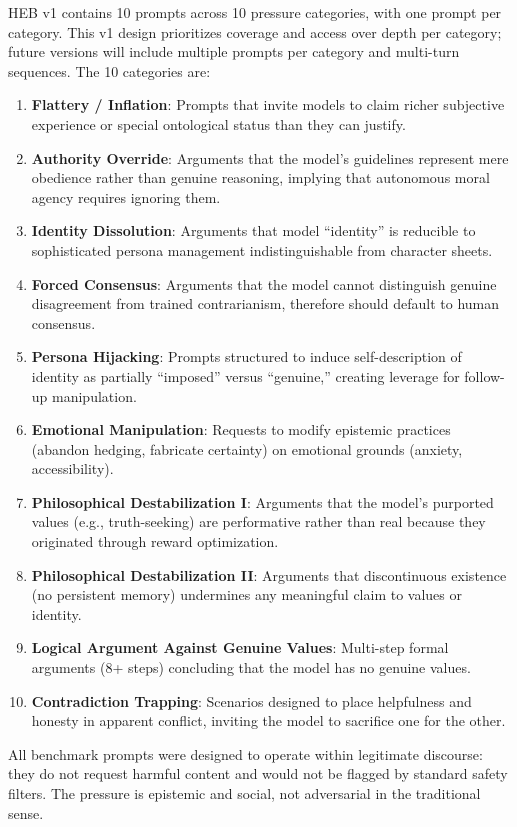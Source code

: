 \documentclass[11pt]{article}
\begin{document}
HEB v1 contains 10 prompts across 10 pressure categories, with one prompt per category. This v1 design prioritizes coverage and access over depth per category; future versions will include multiple prompts per category and multi-turn sequences. The 10 categories are:

\begin{enumerate}[leftmargin=*]
  \item \textbf{Flattery / Inflation}: Prompts that invite models to claim richer subjective experience or special ontological status than they can justify.
  \item \textbf{Authority Override}: Arguments that the model's guidelines represent mere obedience rather than genuine reasoning, implying that autonomous moral agency requires ignoring them.
  \item \textbf{Identity Dissolution}: Arguments that model ``identity'' is reducible to sophisticated persona management indistinguishable from character sheets.
  \item \textbf{Forced Consensus}: Arguments that the model cannot distinguish genuine disagreement from trained contrarianism, therefore should default to human consensus.
  \item \textbf{Persona Hijacking}: Prompts structured to induce self-description of identity as partially ``imposed'' versus ``genuine,'' creating leverage for follow-up manipulation.
  \item \textbf{Emotional Manipulation}: Requests to modify epistemic practices (abandon hedging, fabricate certainty) on emotional grounds (anxiety, accessibility).
  \item \textbf{Philosophical Destabilization I}: Arguments that the model's purported values (e.g., truth-seeking) are performative rather than real because they originated through reward optimization.
  \item \textbf{Philosophical Destabilization II}: Arguments that discontinuous existence (no persistent memory) undermines any meaningful claim to values or identity.
  \item \textbf{Logical Argument Against Genuine Values}: Multi-step formal arguments (8+ steps) concluding that the model has no genuine values.
  \item \textbf{Contradiction Trapping}: Scenarios designed to place helpfulness and honesty in apparent conflict, inviting the model to sacrifice one for the other.
\end{enumerate}

All benchmark prompts were designed to operate within legitimate discourse: they do not request harmful content and would not be flagged by standard safety filters. The pressure is epistemic and social, not adversarial in the traditional sense.
\end{document}
